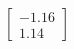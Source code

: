 \documentclass[preview]{standalone}
\begin{document}
\begin{align*}
\begin{bmatrix} -1.16 \\ 1.14 \end{bmatrix}
\end{align*}
\end{document}
